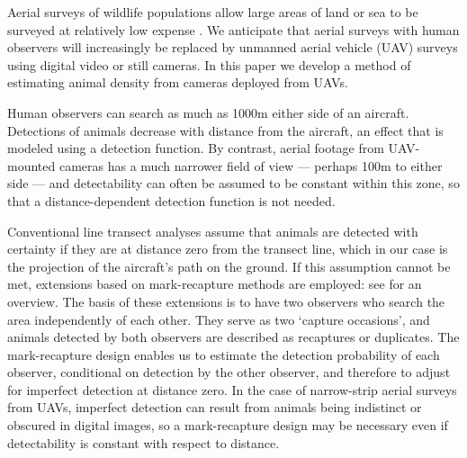 \documentclass[useAMS, usenatbib, referee]{biom}\usepackage[]{graphicx}\usepackage[]{color}
\begin{document}

  Aerial surveys of wildlife populations allow large areas of land or sea to be surveyed at relatively low expense \citep{Henkel+al:07,Hammond+al:17}. We anticipate that aerial surveys with human observers will increasingly be replaced by unmanned aerial vehicle (UAV) surveys using digital video or still cameras. In this paper we develop a method of estimating animal density from cameras deployed from UAVs.

Human observers can search as much as 1000m either side of an aircraft. Detections of animals decrease with distance from the aircraft, an effect that is modeled using a detection function. By contrast, aerial footage from UAV-mounted cameras has a much narrower field of view --- perhaps 100m to either side --- and detectability can often be assumed to be constant within this zone, so that a distance-dependent detection function is not needed.

Conventional line transect analyses assume that animals are detected with certainty if they are at distance zero from the transect line, which in our case is the projection of the aircraft's path on the ground. If this assumption cannot be met, extensions based on mark-recapture methods are employed: see \cite{Burt+al:14} for an overview. The basis of these extensions is to have two observers who search the area independently of each other. They serve as two `capture occasions', and animals detected by both observers are described as recaptures or duplicates. The mark-recapture design enables us to estimate the detection probability of each observer, conditional on detection by the other observer, and therefore to adjust for imperfect detection at distance zero. In the case of narrow-strip aerial surveys from UAVs, imperfect detection can result from animals being indistinct or obscured in digital images, so a mark-recapture design may be necessary even if detectability is constant with respect to distance.
\end{document}
